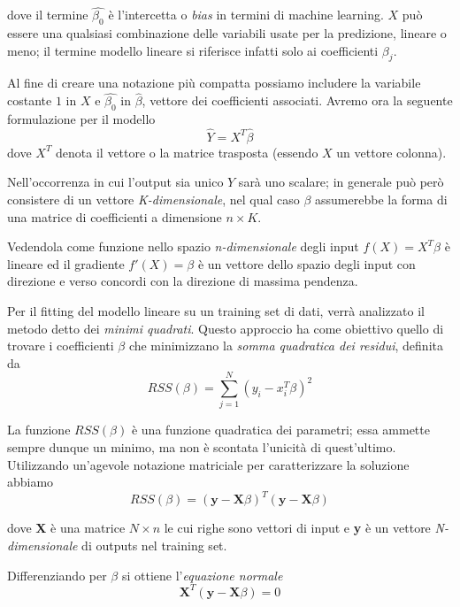\documentclass[12pt,openright,twoside,a4paper]{book}
\begin{document}
dove il termine $\hat{\beta_0}$ è l'intercetta o \textit{bias} in termini di machine learning.
$X$ può essere una qualsiasi combinazione delle variabili usate per la predizione, lineare o meno; il termine
modello lineare si riferisce infatti solo ai coefficienti $\beta_j$.

Al fine di creare una notazione più compatta possiamo includere la variabile costante $1$ in $X$ e $\hat{\beta_0}$ in $\hat{\beta}$, vettore dei coefficienti associati. Avremo ora la seguente formulazione per il modello
\begin{equation}
\hat{Y}=X^T\hat{\beta}
\end{equation}
dove $X^T$ denota il vettore o la matrice trasposta (essendo $X$ un vettore colonna).

Nell'occorrenza in cui l'output sia unico $Y$ sarà uno scalare; in generale può però consistere di un vettore \textit{K-dimensionale}, nel qual caso $\beta$ assumerebbe la forma di una matrice di coefficienti a dimensione $n\times K$.

Vedendola come funzione nello spazio \textit{n-dimensionale} degli input $f(X)=X^T\beta$ è lineare ed il gradiente $f'(X)=\beta$ è un vettore dello spazio degli input con direzione e verso concordi con la direzione di massima pendenza.

Per il fitting del modello lineare su un training set di dati, verrà analizzato il metodo detto dei \textit{minimi quadrati}.
Questo approccio ha come obiettivo quello di trovare i coefficienti $\beta$ che minimizzano la \textit{somma quadratica dei residui}, definita da
\begin{equation}
RSS(\beta)=\sum_{j=1}^{N}(y_i-x_i^T\beta)^2
\end{equation}

La funzione $RSS(\beta)$ è una funzione quadratica dei parametri; essa ammette sempre dunque un minimo, ma non è scontata l'unicità di quest'ultimo.
Utilizzando un'agevole notazione matriciale per caratterizzare la soluzione abbiamo
\begin{equation}
RSS(\beta)=(\textbf{y}-\textbf{X}\beta)^T(\textbf{y}-\textbf{X}\beta)
\end{equation}

dove \textbf{X} è una matrice $N \times n$ le cui righe sono vettori di input e \textbf{y} è un vettore \textit{N-dimensionale} di outputs nel training set.

Differenziando per $\beta$ si ottiene l'\textit{equazione normale}
\begin{equation}
\textbf{X}^T(\textbf{y}-\textbf{X}\beta)=0
\end{equation}
\end{document}
